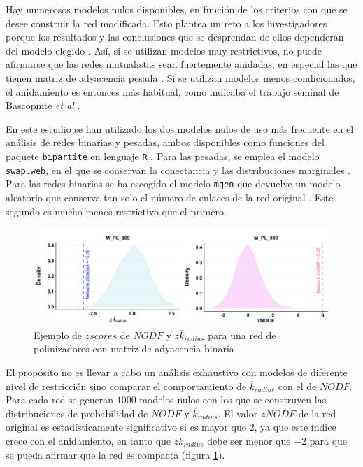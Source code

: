 Hay numerosos modelos nulos disponibles, en función de los criterios con que se desee construir la red modificada. Esto plantea un reto a los investigadores porque los resultados y las conclusiones que se desprendan de ellos dependerán del modelo elegido \cite{ulrich2007null,gotelli2012statistical}. Así, si se utilizan modelos muy restrictivos, no puede afirmarse que las redes mutualistas sean fuertemente anidadas, en especial las que tienen matriz de adyacencia pesada \cite{joppa2010nestedness, staniczenko2013ghost}. Si se utilizan modelos menos condicionados, el anidamiento es entonces más habitual, como indicaba el trabajo seminal de Bascopmte \textit{et al} \cite{bascompte2003nested}.

En este estudio se han utilizado los dos modelos nulos de uso más frecuente en el análisis de redes binarias y pesadas, ambos disponibles como funciones del paquete \texttt{bipartite} en lenguaje \texttt{R} \cite{dormann2008introducing}. Para las pesadas, se emplea el modelo \texttt{swap.web}, en el que se conservan la conectancia y las distribuciones marginales \cite{ dormann2009indices}. Para las redes binarias se ha escogido el modelo \texttt{mgen} que devuelve un modelo aleatorio que conserva tan solo el número de enlaces de la red original \cite{vazquez2009evaluating}. Este segundo es mucho menos restrictivo que el primero.

\begin{figure}[hp!]
\centering
\includegraphics[scale=0.5]{Figures/ESTATICA_zALL.png}
\caption{Ejemplo de $z scores$ de $NODF$ y $z\overline k_{radius}$ para una red de polinizadores con matriz de adyacencia binaria \cite{elberling1999structure} }
\label{fig:ESTATICA_zALL}
\end{figure}

El propósito no es llevar a cabo un análisis exhaustivo con modelos de diferente nivel de restricción sino comparar el comportamiento de $\overline k_{radius}$ con el de $NODF$. Para
cada red se generan $1000$ modelos nulos con los que se construyen las distribuciones de probabilidad de $NODF$ y $\overline k_{radius}$. El valor $zNODF$ de la red original es estadísticamente significativo si es mayor que $2$, ya que este índice crece con el anidamiento, en tanto que $z\overline k_{radius}$ debe ser menor que $-2$ para que se pueda afirmar que la red es compacta (figura \ref{fig:ESTATICA_zALL}).

